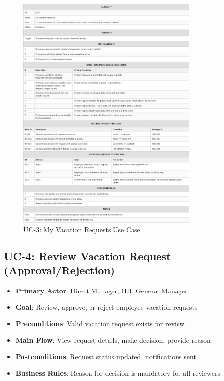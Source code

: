 \documentclass[12pt,a4paper]{article}
\begin{document}
\begin{figure}[H]
\centering
\includegraphics[width=0.8\textwidth]{Use-Cases/UC-3-My-Vacation-Requests/UC-3-My-Vacation-Requests-1.png}
\caption{UC-3: My Vacation Requests Use Case}
\label{fig:uc3}
\end{figure}

\subsection{UC-4: Review Vacation Request (Approval/Rejection)}
\begin{itemize}
    \item \textbf{Primary Actor}: Direct Manager, HR, General Manager
    \item \textbf{Goal}: Review, approve, or reject employee vacation requests
    \item \textbf{Preconditions}: Valid vacation request exists for review
    \item \textbf{Main Flow}: View request details, make decision, provide reason
    \item \textbf{Postconditions}: Request status updated, notifications sent
    \item \textbf{Business Rules}: Reason for decision is mandatory for all reviewers
\end{itemize}
\end{document}
